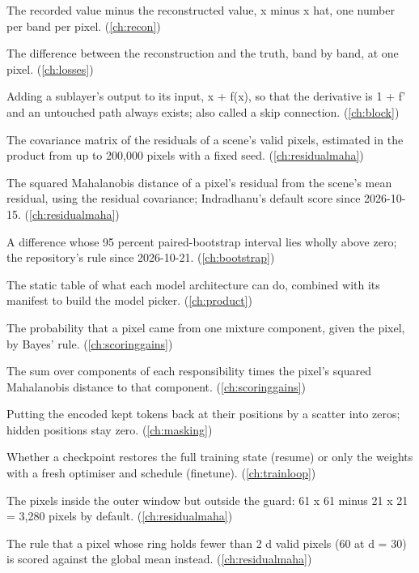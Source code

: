 \begin{description}[style=nextline,leftmargin=1.2em,font=\normalfont\bfseries]
\item[Residual] The recorded value minus the reconstructed value, x minus x hat, one number per band per pixel. (\cref{ch:recon})
\item[Residual (error)] The difference between the reconstruction and the truth, band by band, at one pixel. (\cref{ch:losses})
\item[Residual connection] Adding a sublayer's output to its input, x + f(x), so that the derivative is 1 + f' and an untouched path always exists; also called a skip connection. (\cref{ch:block})
\item[Residual covariance] The covariance matrix of the residuals of a scene's valid pixels, estimated in the product from up to 200,000 pixels with a fixed seed. (\cref{ch:residualmaha})
\item[Residual Mahalanobis distance] The squared Mahalanobis distance of a pixel's residual from the scene's mean residual, using the residual covariance; Indradhanu's default score since 2026-10-15. (\cref{ch:residualmaha})
\item[Resolved gain] A difference whose 95 percent paired-bootstrap interval lies wholly above zero; the repository's rule since 2026-10-21. (\cref{ch:bootstrap})
\item[Resolver] The static table of what each model architecture can do, combined with its manifest to build the model picker. (\cref{ch:product})
\item[Responsibility] The probability that a pixel came from one mixture component, given the pixel, by Bayes' rule. (\cref{ch:scoringgains})
\item[Responsibility-weighted Mahalanobis distance] The sum over components of each responsibility times the pixel's squared Mahalanobis distance to that component. (\cref{ch:scoringgains})
\item[Restore tokens] Putting the encoded kept tokens back at their positions by a scatter into zeros; hidden positions stay zero. (\cref{ch:masking})
\item[Resume mode] Whether a checkpoint restores the full training state (resume) or only the weights with a fresh optimiser and schedule (finetune). (\cref{ch:trainloop})
\item[Ring] The pixels inside the outer window but outside the guard: 61 x 61 minus 21 x 21 = 3,280 pixels by default. (\cref{ch:residualmaha})
\item[Ring fallback] The rule that a pixel whose ring holds fewer than 2 d valid pixels (60 at d = 30) is scored against the global mean instead. (\cref{ch:residualmaha})

\end{description}
